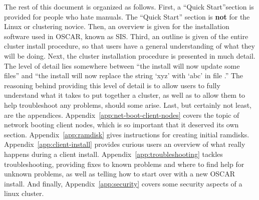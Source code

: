 The rest of this document is organized as follows.  \begchange First,
a ``Quick Start''section is provided for people who hate manuals.  The
``Quick Start'' section is {\bf not} for the Linux or clustering
novice. Then, an overview is given for the installation software used
in OSCAR, known as SIS.
%
\begchange
%
Third, 
%
\endchange
%
an outline is given of the entire cluster install procedure, so that
users have a general understanding of what they will be doing.  Next,
the cluster installation procedure is presented in much detail.  The
level of detail lies somewhere between ``the install will now update
some files'' and ``the install will now replace the string `xyz' with
`abc' in file .'' The reasoning behind providing this
level of detail is to allow users to fully understand what it takes to
put together a cluster, as well as to allow them to help troubleshoot
any problems, should some arise. Last, but certainly not least, are
the appendices.  Appendix~\ref{app:net-boot-client-nodes} covers the
topic of network booting client nodes, which is so important that it
deserved its own section.  Appendix~\ref{app:ramdisk} gives
instructions for creating initial ramdisks.
Appendix~\ref{app:client-install} provides curious users an overview
of what really happens during a client install.
%
\begchange
%
Appendix~\ref{app:troubleshooting} tackles troubleshooting, providing
fixes to known problems and where to find help for unknown problems,
as well as telling how to start over with a new OSCAR install.  And
finally, Appendix~\ref{app:security} covers some security aspects of a
linux cluster.
%
\endchange
